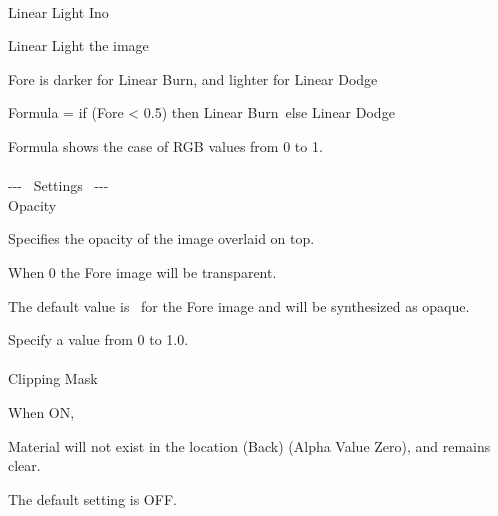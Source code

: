 \documentclass[a4paper,12pt]{article}
\begin{document}
\thispagestyle{empty}

\Large
\noindent \\
Linear Light Ino\medskip
\par
\normalsize
Linear Light the image\par
Fore is darker for Linear Burn, and lighter for Linear Dodge\par
Formula = if (Fore < 0.5) then \textquotedbl Linear Burn\textquotedbl \ else \textquotedbl Linear Dodge\textquotedbl\par
Formula shows the case of RGB values from 0 to 1.\\
\\
-{-}- \ Settings \ -{-}-\\
Opacity\par
Specifies the opacity of the image overlaid on top.\par
When 0 the Fore image will be transparent.\par
The default value is \textquotedbl \ for the Fore image and will be synthesized as opaque.\par
Specify a value from 0 to 1.0.\\
\\
Clipping Mask\par
When ON,\par
Material will not exist in the location (Back) (Alpha Value Zero), and remains clear.\par
The default setting is OFF.
\end{document}
